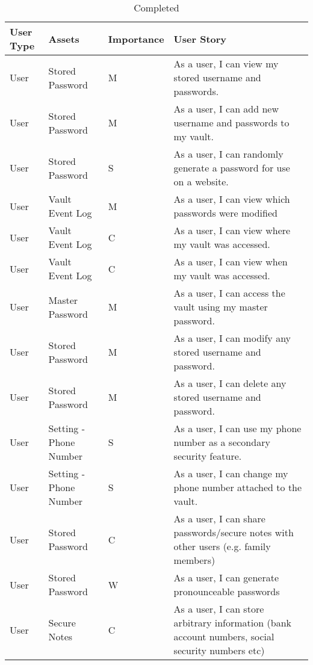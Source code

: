 \documentclass{article}
\begin{document}
\begin{table}[H]
  \centering
  {
    \renewcommand\arraystretch{1.25}
    \begin{tabular}{>{\centering}m{1cm} >{\centering}m{4cm} >{\centering}m{2cm} >{\centering\arraybackslash}m{8cm} }
    \toprule
    User Type & Assets & Importance & User Story \\
    \midrule
    User & Stored Password & M & As a user, I can view my stored username and passwords. \\
    User & Stored Password & M & As a user, I can add new username and passwords to my vault. \\
    User & Stored Password & S & As a user, I can randomly generate a password for use on a website. \\
    User & Vault Event Log & M & As a user, I can view which passwords were modified \\
    User & Vault Event Log & C & As a user, I can view where my vault was accessed. \\
    User & Vault Event Log & C & As a user, I can view when my vault was accessed. \\
    User & Master Password & M & As a user, I can access the vault using my master password. \\
    User & Stored Password & M & As a user, I can modify any stored username and password. \\
    User & Stored Password & M & As a user, I can delete any stored username and password. \\
    User & Setting - Phone Number & S & As a user, I can use my phone number as a secondary security feature. \\
    User & Setting - Phone Number & S & As a user, I can change my phone number attached to the vault. \\
    User & Stored Password & C & As a user, I can share passwords/secure notes with other users (e.g. family members) \\
    User & Stored Password & W & As a user, I can generate pronounceable passwords \\
    User & Secure Notes & C & As a user, I can store arbitrary information (bank account numbers, social security numbers etc) \\
    \bottomrule
    \end{tabular}
  }
  \caption{Completed}
  \label{tab:completed}
\end{table}
\newpage
\end{document}

